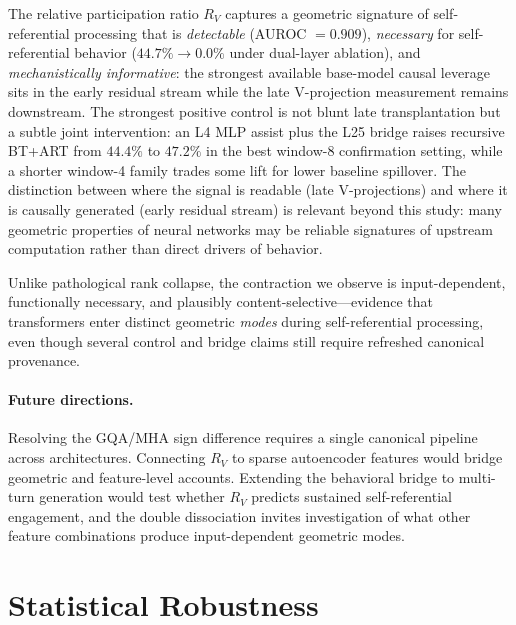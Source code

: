 \documentclass{article}
\newcommand{\RV}{R_V}
\begin{document}
The relative participation ratio $\RV$ captures a geometric signature of self-referential
processing that is \emph{detectable} (AUROC $= 0.909$),
\emph{necessary} for self-referential behavior ($44.7\% \to 0.0\%$ under dual-layer ablation),
and \emph{mechanistically informative}: the strongest available base-model causal leverage sits in
the early residual stream while the late V-projection measurement remains downstream.
The strongest positive control is not blunt late transplantation but a subtle joint intervention:
an L4 MLP assist plus the L25 bridge raises recursive BT+ART from $44.4\%$ to $47.2\%$ in the
best window-8 confirmation setting, while a shorter window-4 family trades some lift for lower
baseline spillover.
The distinction between where the signal is readable (late V-projections) and where it is
causally generated (early residual stream) is relevant beyond this study: many geometric
properties of neural networks may be reliable signatures of upstream computation rather than
direct drivers of behavior.

Unlike pathological rank collapse, the contraction we observe is input-dependent, functionally
necessary, and plausibly content-selective---evidence that transformers enter distinct geometric
\emph{modes} during self-referential processing, even though several control and bridge claims
still require refreshed canonical provenance.

\paragraph{Future directions.}
Resolving the GQA/MHA sign difference requires a single canonical pipeline across architectures.
Connecting $\RV$ to sparse autoencoder features would bridge geometric and feature-level
accounts.
Extending the behavioral bridge to multi-turn generation would test whether $\RV$ predicts
sustained self-referential engagement, and the double dissociation invites investigation of
what other feature combinations produce input-dependent geometric modes.






\appendix

\section{Statistical Robustness}
\label{app:stats}
\end{document}

